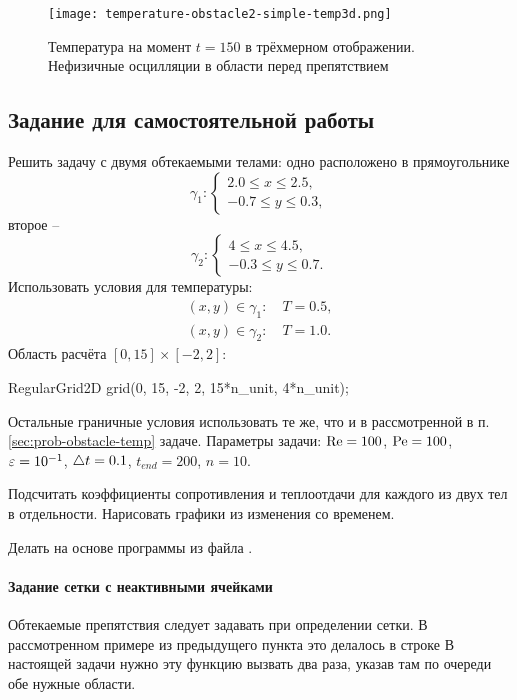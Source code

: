 \begin{figure}[h!]
\centering
\texttt{[image: temperature-obstacle2-simple-temp3d.png]}
\caption{Температура на момент $t=150$ в трёхмерном отображении. Нефизичные осцилляции в области перед препятствием}
\label{fig:temperature-obstacle2-simple-temp3d}
\end{figure}


\subsection{Задание для самостоятельной работы}
Решить задачу с двумя обтекаемыми телами: одно расположено
в прямоугольнике
$$
\gamma_1: \begin{cases}
2.0 \leq x \leq 2.5, \\
-0.7 \leq y \leq 0.3,
\end{cases}
$$
второе --
$$
\gamma_2: \begin{cases}
4 \leq x \leq 4.5, \\
-0.3 \leq y \leq 0.7.
\end{cases}
$$
Использовать условия для температуры:
\begin{align*}
(x, y) \in \gamma_1: \quad T=0.5,\\
(x, y) \in \gamma_2: \quad T=1.0.
\end{align*}
Область расчёта $[0,15]\times[-2,2]$:
\begin{cppcode}
RegularGrid2D grid(0, 15, -2, 2, 15*n_unit, 4*n_unit);
\end{cppcode}
Остальные граничные условия использовать те же, что и
в рассмотренной в п. \ref{sec:prob-obstacle-temp} задаче.
Параметры задачи:
$\mathrm{Re} = 100$, $\mathrm{Pe} = 100$, $\varepsilon=10^{-1}$, $\triangle t = 0.1$, $t_{end} = 200$, $n=10$.

Подсчитать коэффициенты сопротивления и теплоотдачи для каждого из двух
тел в отдельности. Нарисовать графики из изменения со временем.

Делать на основе программы из файла .

\paragraph{Задание сетки с неактивными ячейками}
Обтекаемые препятствия следует задавать
при определении сетки. В рассмотренном примере из предыдущего пункта
это делалось в строке
В настоящей задачи нужно эту функцию вызвать два раза, указав там по очереди обе нужные области.

